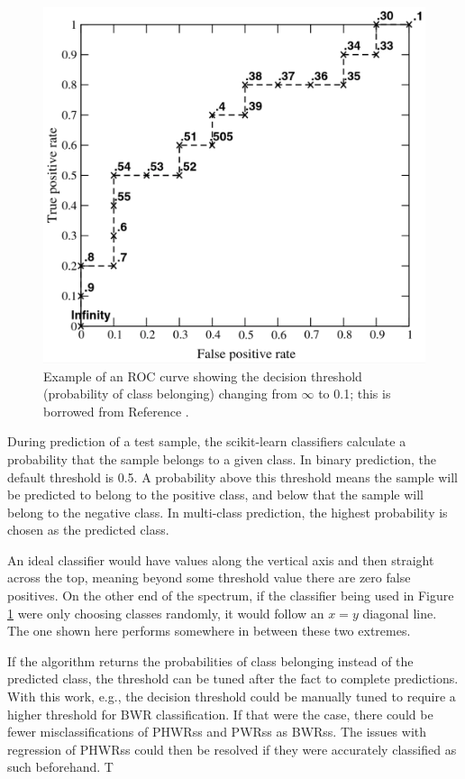\begin{figure}[!htb]
  \centering
  \includegraphics[width=0.8\linewidth]{./chapters/concl/roc.png}
  \caption[Example of an \acrshort{ROC} curve]
          {Example of an \acrshort{ROC} curve showing the decision threshold 
           (probability of class belonging) changing from $\infty$ to 0.1; this 
           is borrowed from Reference \cite{roc}.}
  \label{fig:roc}
\end{figure}

During prediction of a test sample, the scikit-learn classifiers calculate a
probability that the sample belongs to a given class. In binary prediction, the
default threshold is 0.5. A probability above this threshold means the sample
will be predicted to belong to the positive class, and below that the sample
will belong to the negative class.  In multi-class prediction, the highest
probability is chosen as the predicted class.

An ideal classifier would have values along the vertical axis and then straight
across the top, meaning beyond some threshold value there are zero false
positives. On the other end of the spectrum, if the classifier being used in
Figure \ref{fig:roc} were only choosing classes randomly, it would follow an
$x=y$ diagonal line. The one shown here performs somewhere in between these two
extremes. 

If the algorithm returns the probabilities of class belonging instead of the
predicted class, the threshold can be tuned after the fact to complete
predictions.  With this work, e.g., the decision threshold  could be manually
tuned to require a higher threshold for \gls{BWR} classification. If that were
the case, there could be fewer misclassifications of \glspl{PHWR}s and
\glspl{PWR}s as \glspl{BWR}s. The issues with regression of \glspl{PHWR}s could
then be resolved if they were accurately classified as such beforehand. T

